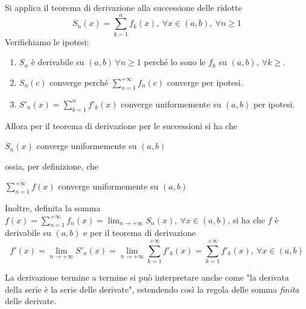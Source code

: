 \begin{demonstration}
	Si applica il teorema di derivazione alla successione delle ridotte
	\begin{equation*}
		S_n\left(x\right)=\sum_{k=1}^{n}f_k\left(x\right),\ \forall x\in\left(a,b\right),\ \forall n\geq 1
	\end{equation*}
Verifichiamo le ipotesi:
\begin{enumerate}
	\item $S_n$ è derivabile su $\left(a,b\right)\, \forall n\geq 1$ perché lo sono le $f_k$ su $\left(a,b\right),\ \forall k\geq $.
	\item $S_n\left(c\right)$ converge perché $\displaystyle\sum_{n=1}^{+\infty}f_n\left(c\right)$ converge per ipotesi.
	\item $S'_n\left(x\right)=\displaystyle\sum_{k=1}^{n}f'_k\left(x\right)$ converge uniformemente su $\left(a,b\right)$ per ipotesi.
\end{enumerate}
Allora per il teorema di derivazione per le successioni si ha che
\begin{center}
	$S_n\left(x\right)$ converge uniformemente su $\left(a,b\right)$
\end{center}
ossia, per definizione, che
\begin{center}
	$\displaystyle\sum_{n=1}^{+\infty}f\left(x\right)$ converge uniformemente su $\left(a,b\right)$
\end{center}
Inoltre, definita la somma $\displaystyle f\left(x\right)=\sum_{n=1}^{+\infty}f_n\left(x\right)=\lim_{n\to+\infty}S_n\left(x\right),\ \forall x\in\left(a,b\right)$, si ha che $f$ è derivabile su $\left(a,b\right)$ e per il teorema di derivazione
\begin{equation*}
	f'\left(x\right)=\lim_{n\to+\infty}S'_n\left(x\right)=\lim_{n\to+\infty}\sum_{k=1}^{+\infty}f'_k\left(x\right)=\sum_{k=1}^{+\infty}f'_k\left(x\right),\ \forall x\in\left(a,b\right)
\end{equation*}
\end{demonstration}
\begin{observe}
	La derivazione termine a termine si può interpretare anche come "la derivata della serie è la serie delle derivate", estendendo così la regola delle somma \textit{finita} delle derivate.
\end{observe}